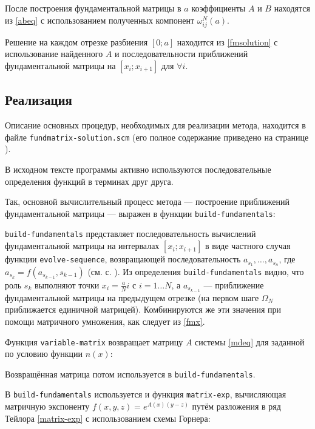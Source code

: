 \documentclass{article}
\newcommand{\filename}[1]{\texttt{#1}}
\newcommand{\procname}[1]{\texttt{#1}}
\numberwithin{equation}{section}
\begin{document}
После построения фундаментальной матрицы в $a$ коэффициенты $A$ и $B$
находятся из \eqref{abeq} с использованием полученных компонент
$\omega_{ij}^N(a)$.

Решение на каждом отрезке разбиения $[0; a]$ находится из
\eqref{fmsolution} с использование найденного $A$ и последовательности
приближений фундаментальной матрицы на $[x_i; x_{i+1}]$ для $\forall
i$.

\clearpage
\subsection{Реализация}

Описание основных процедур, необходимых для реализации метода,
находится в файле \filename{fundmatrix-solution.scm} (его полное содержание
приведено на странице \pageref{fundmatrix-solution.scm-full-listing}).

В исходном тексте программы активно используются последовательные
определения функций в терминах друг друга.

Так, основной вычислительный процесс метода — построение приближений
фундаментальной матрицы — выражен в функции
\procname{build-fundamentals}:



\procname{build-fundamentals} представляет последовательность вычислений
фундаментальной матрицы на интервалах $[x_i; x_{i+1}]$ в виде частного
случая функции \procname{evolve-sequence}, возвращающей
последовательность $a_{s_1}, \dotsc, a_{s_n}$, где $a_{s_k} =
f(a_{s_{k-1}}, s_{k-1})$
(см. с. \pageref{shared.scm-full-listing}). Из определения
\procname{build-fundamentals} видно, что роль $s_k$ выполняют точки $x_i
= \frac{a}{N}i$ с $i = 1 \dotso N$, а $a_{s_{k-1}}$ — приближение
фундаментальной матрицы на предыдущем отрезке (на первом шаге
$\Omega_N$ приближается единичной матрицей). Комбинируются же эти
значения при помощи матричного умножения, как следует из \eqref{fmx}.

Функция \procname{variable-matrix} возвращает матрицу $A$ системы
\eqref{mdeq} для заданной по условию функции $n(x)$:



Возвращённая матрица потом используется в \procname{build-fundamentals}.

В \procname{build-fundamentals} используется и функция
\procname{matrix-exp}, вычисляющая матричную
экспоненту $f(x, y, z) = e^{A(x)(y-z)}$ путём разложения в ряд Тейлора
\eqref{matrix-exp} с использованием схемы Горнера:
\end{document}
